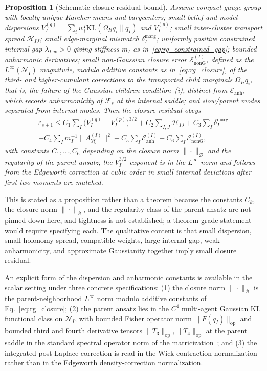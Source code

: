\documentclass[11pt]{article}
\newtheorem{proposition}{Proposition}
\begin{document}
\begin{proposition}[Schematic closure-residual bound]
\label{thm:rg_residual}
Assume compact gauge group with locally unique Karcher means and barycenters; small belief and model dispersions $V_I^{(q)} = \sum_i w_i^I \mathrm{KL}(\Omega_{Ii}q_i \| q_I)$ and $V_I^{(p)}$; small inter-cluster transport spread $\mathcal{H}_{IJ}$; small edge-marginal mismatch $\delta_I^{\mathrm{marg}}$; uniformly positive constrained internal gap $\lambda_{I,w} > 0$ giving stiffness $m_I$ as in~\eqref{eq:rg_constrained_gap}; bounded anharmonic derivatives; small non-Gaussian closure error $\mathcal{E}_{\mathrm{nonG}}^{(I)}$, defined as the $L^\infty(\mathcal{N}_I)$ magnitude, modulo additive constants as in~\eqref{eq:rg_closure}, of the third- and higher-cumulant corrections to the transported child marginals $\Omega_{Ii}q_i$, that is, the failure of the Gaussian-children condition~(i), distinct from $\mathcal{E}_{\mathrm{anh}}$, which records anharmonicity of $\mathcal{F}_s$ at the internal saddle; and slow/parent modes separated from internal modes. Then the closure residual obeys
\begin{multline}
\varepsilon_{s+1} \le C_1\sum_I \big(V_I^{(q)} + V_I^{(p)}\big)^{3/2} + C_2\sum_{I,J}\mathcal{H}_{IJ} + C_3\sum_I \delta_I^{\mathrm{marg}} \\
 + C_4\sum_I m_I^{-1}\|A_{Y\xi}^{(I)}\|^2 + C_5\sum_I \mathcal{E}_{\mathrm{anh}}^{(I)} + C_6\sum_I \mathcal{E}_{\mathrm{nonG}}^{(I)},
\end{multline}
with constants $C_1, \ldots, C_6$ depending on the closure norm $\|\cdot\|_\mathcal{B}$ and the regularity of the parent ansatz; the $V_I^{3/2}$ exponent is in the $L^\infty$ norm and follows from the Edgeworth correction at cubic order in small internal deviations after first two moments are matched.
\end{proposition}

This is stated as a proposition rather than a theorem because the constants $C_k$, the closure norm $\|\cdot\|_\mathcal{B}$, and the regularity class of the parent ansatz are not pinned down here, and tightness is not established; a theorem-grade statement would require specifying each. The qualitative content is that small dispersion, small holonomy spread, compatible weights, large internal gap, weak anharmonicity, and approximate Gaussianity together imply small closure residual.

An explicit form of the dispersion and anharmonic constants is available in the scalar setting under three concrete specifications: (1) the closure norm $\|\cdot\|_\mathcal{B}$ is the parent-neighborhood $L^\infty$ norm modulo additive constants of Eq.~\eqref{eq:rg_closure}; (2) the parent ansatz lies in the $C^4$ multi-agent Gaussian KL functional class on $\mathcal{N}_I$, with bounded Fisher operator norm $\|F(q_I)\|_{\mathrm{op}}$ and bounded third and fourth derivative tensors $\|T_3\|_{\mathrm{op}}, \|T_4\|_{\mathrm{op}}$ at the parent saddle in the standard spectral operator norm of the matricization~\cite{HornJohnson2013}; and (3) the integrated post-Laplace correction is read in the Wick-contraction normalization rather than in the Edgeworth density-correction normalization.
\end{document}
